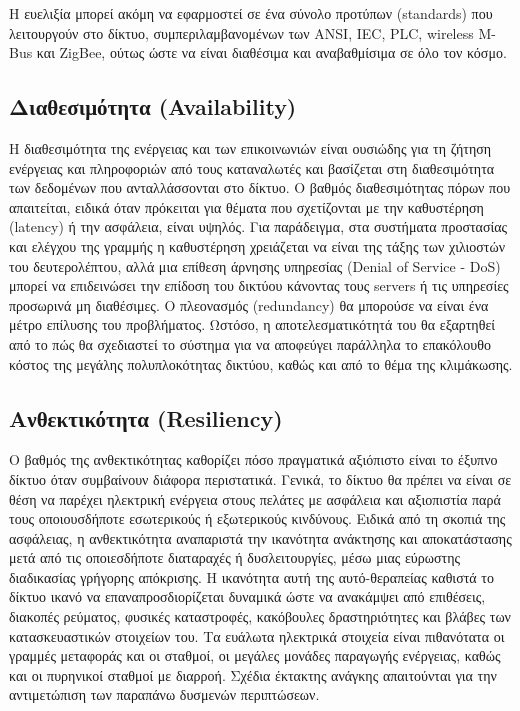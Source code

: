 \documentclass[12pt, a4paper, oneside]{report}
\begin{document}
Η ευελιξία μπορεί ακόμη να εφαρμοστεί σε ένα σύνολο προτύπων (standards) που λειτουργούν στο δίκτυο, συμπεριλαμβανομένων των ANSI, IEC, PLC, wireless M-Bus και ZigBee, ούτως ώστε να είναι διαθέσιμα και αναβαθμίσιμα σε όλο τον κόσμο.

\subsection*{Διαθεσιμότητα (Availability)}

Η διαθεσιμότητα της ενέργειας και των επικοινωνιών είναι ουσιώδης για τη ζήτηση ενέργειας και πληροφοριών από τους καταναλωτές και βασίζεται στη διαθεσιμότητα των δεδομένων που ανταλλάσσονται στο δίκτυο. Ο βαθμός διαθεσιμότητας πόρων που απαιτείται, ειδικά όταν πρόκειται για θέματα που σχετίζονται με την καθυστέρηση (latency) ή την ασφάλεια, είναι υψηλός. Για παράδειγμα, στα συστήματα προστασίας και ελέγχου της γραμμής η καθυστέρηση χρειάζεται να είναι της τάξης των χιλιοστών του δευτερολέπτου, αλλά μια επίθεση άρνησης υπηρεσίας (Denial of Service - DoS) μπορεί να επιδεινώσει την επίδοση του δικτύου κάνοντας τους servers ή τις υπηρεσίες προσωρινά μη διαθέσιμες. Ο πλεονασμός (redundancy) θα μπορούσε να είναι ένα μέτρο επίλυσης του προβλήματος. Ωστόσο, η αποτελεσματικότητά του θα εξαρτηθεί από το πώς θα σχεδιαστεί το σύστημα για να αποφεύγει παράλληλα το επακόλουθο κόστος της μεγάλης πολυπλοκότητας δικτύου, καθώς και από το θέμα της κλιμάκωσης.

\subsection*{Ανθεκτικότητα (Resiliency)}

O βαθμός της ανθεκτικότητας καθορίζει πόσο πραγματικά αξιόπιστο είναι το έξυπνο δίκτυο όταν συμβαίνουν διάφορα περιστατικά. Γενικά, το δίκτυο θα πρέπει να είναι σε θέση να παρέχει ηλεκτρική ενέργεια στους πελάτες με ασφάλεια και αξιοπιστία παρά τους οποιουσδήποτε εσωτερικούς ή εξωτερικούς κινδύνους. Ειδικά από τη σκοπιά της ασφάλειας, η ανθεκτικότητα αναπαριστά την ικανότητα ανάκτησης και αποκατάστασης μετά από τις οποιεσδήποτε διαταραχές ή δυσλειτουργίες, μέσω μιας εύρωστης διαδικασίας γρήγορης απόκρισης. Η ικανότητα αυτή της αυτό-θεραπείας καθιστά το δίκτυο ικανό να επαναπροσδιορίζεται δυναμικά ώστε να ανακάμψει από επιθέσεις, διακοπές ρεύματος, φυσικές καταστροφές, κακόβουλες δραστηριότητες και βλάβες των κατασκευαστικών στοιχείων του. Τα ευάλωτα ηλεκτρικά στοιχεία είναι πιθανότατα οι γραμμές μεταφοράς και οι σταθμοί, οι μεγάλες μονάδες παραγωγής ενέργειας, καθώς και οι πυρηνικοί σταθμοί με διαρροή. Σχέδια έκτακτης ανάγκης απαιτούνται για την αντιμετώπιση των παραπάνω δυσμενών περιπτώσεων.
\end{document}
